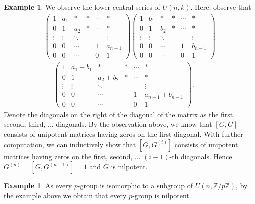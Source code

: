 \documentclass[12pt]{report}
\theoremstyle{plain}
\theoremstyle{remark}
\theoremstyle{definition}
\newtheorem{example}[theorem]{Example}
\newcommand{\Z}{\mathbb{Z}}
\begin{document}
\begin{example}
    We observe the lower central series of $U(n,k)$. Here, observe that
    \begin{align*}
        \begin{pmatrix}
            1 & a_1 & * & * & \cdots & * \\
            0 & 1 & a_2 & * & \cdots & * \\
            \vdots & \vdots & \ddots & & & \vdots \\
            0 & 0 & \cdots & & 1 & a_{n-1} \\
            0 & 0 & \cdots & & 0 & 1
        \end{pmatrix} \begin{pmatrix}
            1 & b_1 & * & * & \cdots & * \\
            0 & 1 & b_2 & * & \cdots & * \\
            \vdots & \vdots & \ddots & & & \vdots \\
            0 & 0 & \cdots & & 1 & b_{n-1} \\
            0 & 0 & \cdots & & 0 & 1
        \end{pmatrix} \\= \begin{pmatrix}
            1 & a_1 + b_1 & * & * & \cdots & * \\
            0 & 1 & a_2 + b_2 & * & \cdots & * \\
            \vdots & \vdots & \ddots & & & \vdots \\
            0 & 0 & \cdots & & 1 & a_{n-1} + b_{n-1} \\
            0 & 0 & \cdots & & 0 & 1
        \end{pmatrix}.
    \end{align*}
    Denote the diagonals on the right of the diagonal of the matrix as the first, second, third, ... diagonals. By the observation above, we know that $[G,G]$ consists of unipotent matrices having zeros on the first diagonal. With further computation, we can inductively show that $[G,G^{(i)}]$ consists of unipotent matrices having zeros on the first, second, ... $(i-1)$-th diagonals. Hence $G^{(n)}=[G,G^{(n-1)}]=1$ and $G$ is nilpotent.
\end{example}

\begin{example}
    As every $p$-group is isomorphic to a subgroup of $U(n,\Z/p\Z)$, by the example above we obtain that every $p$-group is nilpotent.
\end{example}
\end{document}

